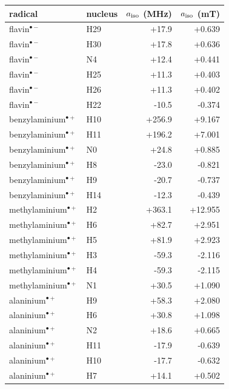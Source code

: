 \begin{tabular}{llrr}
\toprule
radical & nucleus & $a_{\rm iso}$ (MHz) & $a_{\rm iso}$ (mT) \\
\midrule
flavin$^{\bullet-}$ & H29 & +17.9 & +0.639 \\
flavin$^{\bullet-}$ & H30 & +17.8 & +0.636 \\
flavin$^{\bullet-}$ & N4 & +12.4 & +0.441 \\
flavin$^{\bullet-}$ & H25 & +11.3 & +0.403 \\
flavin$^{\bullet-}$ & H26 & +11.3 & +0.402 \\
flavin$^{\bullet-}$ & H22 & -10.5 & -0.374 \\
benzylaminium$^{\bullet+}$ & H10 & +256.9 & +9.167 \\
benzylaminium$^{\bullet+}$ & H11 & +196.2 & +7.001 \\
benzylaminium$^{\bullet+}$ & N0 & +24.8 & +0.885 \\
benzylaminium$^{\bullet+}$ & H8 & -23.0 & -0.821 \\
benzylaminium$^{\bullet+}$ & H9 & -20.7 & -0.737 \\
benzylaminium$^{\bullet+}$ & H14 & -12.3 & -0.439 \\
methylaminium$^{\bullet+}$ & H2 & +363.1 & +12.955 \\
methylaminium$^{\bullet+}$ & H6 & +82.7 & +2.951 \\
methylaminium$^{\bullet+}$ & H5 & +81.9 & +2.923 \\
methylaminium$^{\bullet+}$ & H3 & -59.3 & -2.116 \\
methylaminium$^{\bullet+}$ & H4 & -59.3 & -2.115 \\
methylaminium$^{\bullet+}$ & N1 & +30.5 & +1.090 \\
alaninium$^{\bullet+}$ & H9 & +58.3 & +2.080 \\
alaninium$^{\bullet+}$ & H6 & +30.8 & +1.098 \\
alaninium$^{\bullet+}$ & N2 & +18.6 & +0.665 \\
alaninium$^{\bullet+}$ & H11 & -17.9 & -0.639 \\
alaninium$^{\bullet+}$ & H10 & -17.7 & -0.632 \\
alaninium$^{\bullet+}$ & H7 & +14.1 & +0.502 \\
\bottomrule
\end{tabular}
